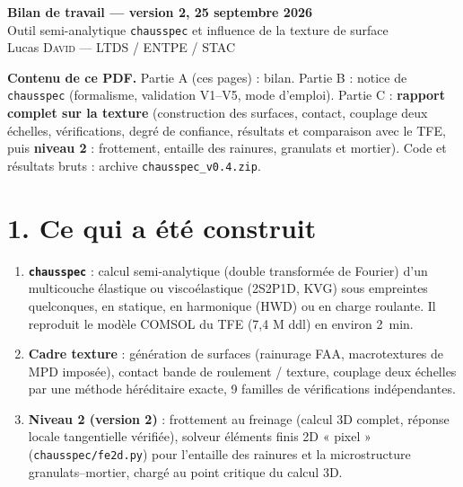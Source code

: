 \documentclass[11pt,a4paper]{article}
\begin{document}
\sloppy
\begin{center}{\LARGE\bfseries Bilan de travail --- version 2, 25 septembre 2026}\\[4pt]
{\large Outil semi-analytique \texttt{chausspec} et influence de la texture de surface}\\[4pt]
Lucas \textsc{David} --- LTDS / ENTPE / STAC\end{center}
\begin{encadre}
\textbf{Contenu de ce PDF.} Partie A (ces pages) : bilan. Partie B : notice de \texttt{chausspec}
(formalisme, validation V1--V5, mode d'emploi). Partie C : \textbf{rapport complet sur la
texture} (construction des surfaces, contact, couplage deux échelles, vérifications, degré de
confiance, résultats et comparaison avec le TFE, puis \textbf{niveau 2} : frottement, entaille des
rainures, granulats et mortier). Code et résultats bruts : archive \texttt{chausspec\_v0.4.zip}.
\end{encadre}
\section*{1. Ce qui a été construit}
\begin{enumerate}[nosep]
\item \textbf{\texttt{chausspec}} : calcul semi-analytique (double transformée de Fourier) d'un
multicouche élastique ou viscoélastique (2S2P1D, KVG) sous empreintes quelconques, en statique,
en harmonique (HWD) ou en charge roulante. Il reproduit le modèle COMSOL du TFE (7,4 M ddl) en
environ \SI{2}{min}.
\item \textbf{Cadre texture} : génération de surfaces (rainurage FAA, macrotextures de MPD
imposée), contact bande de roulement / texture, couplage deux échelles par une méthode
héréditaire exacte, 9 familles de vérifications indépendantes.
\item \textbf{Niveau 2 (version 2)} : frottement au freinage (calcul 3D complet, réponse locale
tangentielle vérifiée), solveur éléments finis 2D « pixel » (\texttt{chausspec/fe2d.py}) pour
l'entaille des rainures et la microstructure granulats--mortier, chargé au point critique du
calcul 3D.
\end{enumerate}
\end{document}
